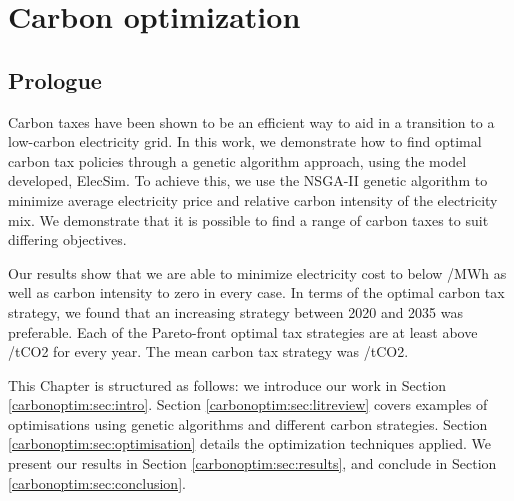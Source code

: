 \chapter{Carbon optimization}
\label{chapter:carbon}
\ifpdf
    \graphicspath{{Chapter3/Figs/Raster/}{Chapter3/Figs/PDF/}{Chapter3/Figs/}}
\else
    \graphicspath{{Chapter3/Figs/Vector/}{Chapter3/Figs/}}
\fi



\section*{Prologue}


Carbon taxes have been shown to be an efficient way to aid in a transition to a low-carbon electricity grid. In this work, we demonstrate how to find optimal carbon tax policies through a genetic algorithm approach, using the model developed, ElecSim. To achieve this, we use the NSGA-II genetic algorithm to minimize average electricity price and relative carbon intensity of the electricity mix. We demonstrate that it is possible to find a range of carbon taxes to suit differing objectives. 

Our results show that we are able to minimize electricity cost to below /MWh as well as carbon intensity to zero in every case. In terms of the optimal carbon tax strategy, we found that an increasing strategy between 2020 and 2035 was preferable. Each of the Pareto-front optimal tax strategies are at least above /tCO2 for every year. The mean carbon tax strategy was /tCO2.

This Chapter is structured as follows: we introduce our work in Section \ref{carbonoptim:sec:intro}. Section \ref{carbonoptim:sec:litreview} covers examples of optimisations using genetic algorithms and different carbon strategies. Section \ref{carbonoptim:sec:optimisation} details the optimization techniques applied. We present our results in Section \ref{carbonoptim:sec:results}, and conclude in Section \ref{carbonoptim:sec:conclusion}.

